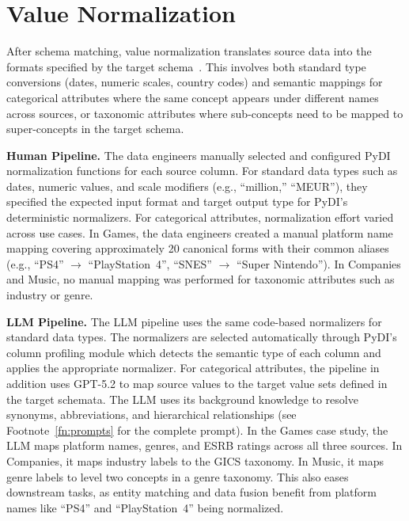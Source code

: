 \section{Value Normalization}
\label{sec:normalization}
After schema matching, value normalization translates source data into the formats specified by the target schema~\cite{rahm2000dataCleaning, narayan2022can}. This involves both standard type conversions (dates, numeric scales, country codes) and semantic mappings for categorical attributes where the same concept appears under different names across sources, or taxonomic attributes where sub-concepts need to be mapped to super-concepts in the target schema.

\textbf{Human Pipeline.} \label{sec:norm_approach}
The data engineers manually selected and configured PyDI normalization functions for each source column. For standard data types such as dates, numeric values, and scale modifiers (e.g., ``million,'' ``MEUR''), they specified the expected input format and target output type for PyDI's deterministic normalizers. For categorical attributes, normalization effort varied across use cases. In Games, the data engineers created a manual platform name mapping covering approximately 20 canonical forms with their common aliases (e.g., ``PS4'' $\to$ ``PlayStation~4'', ``SNES'' $\to$ ``Super Nintendo''). In Companies and Music, no manual mapping was performed for taxonomic attributes such as industry or genre.

\textbf{LLM Pipeline.}
The LLM pipeline uses the same code-based normalizers for standard data types. The normalizers are selected automatically through PyDI's column profiling module which detects the semantic type of each column and applies the appropriate normalizer. For categorical attributes, the pipeline in addition uses GPT-5.2 to map source values to the target value sets defined in the target schemata. The LLM uses its background knowledge to resolve synonyms, abbreviations, and hierarchical relationships (see Footnote~\ref{fn:prompts} for the complete prompt). In the Games case study, the LLM maps platform names, genres, and ESRB ratings across all three sources. In Companies, it maps industry labels to the GICS taxonomy. In Music, it maps genre labels to level two concepts in a genre taxonomy. This also eases downstream tasks, as entity matching and data fusion benefit from platform names like ``PS4'' and ``PlayStation~4'' being normalized.



